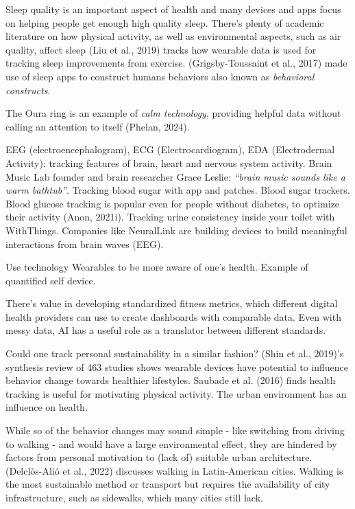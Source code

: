 \documentclass[
  letterpaper,
  DIV=11,
  numbers=noendperiod]{scrartcl}
\begin{document}
Sleep quality is an important aspect of health and many devices and apps
focus on helping people get enough high quality sleep. There's plenty of
academic literature on how physical activity, as well as environmental
aspects, such as air quality, affect sleep (Liu et al., 2019) tracks how
wearable data is used for tracking sleep improvements from exercise.
(Grigsby-Toussaint et al., 2017) made use of sleep apps to construct
humans behaviors also known as \emph{behavioral constructs}.

The Oura ring is an example of \emph{calm technology}, providing helpful
data without calling an attention to itself (Phelan, 2024).

EEG (electroencephalogram), ECG (Electrocardiogram), EDA (Electrodermal
Activity): tracking features of brain, heart and nervous system
activity. Brain Music Lab founder and brain researcher Grace Leslie:
\emph{``brain music sounds like a warm bathtub''}. Tracking blood sugar
with app and patches. Blood sugar trackers. Blood glucose tracking is
popular even for people without diabetes, to optimize their activity
(Anon, 2021i). Tracking urine consistency inside your toilet with
WithThings. Companies like NeuralLink are building devices to build
meaningful interactions from brain waves (EEG).

Use technology Wearables to be more aware of one's health. Example of
quantified self device.

There's value in developing standardized fitness metrics, which
different digital health providers can use to create dashboards with
comparable data. Even with messy data, AI has a useful role as a
translator between different standards.

Could one track personal sustainability in a similar fashion? (Shin et
al., 2019)'s synthesis review of 463 studies shows wearable devices have
potential to influence behavior change towards healthier lifestyles.
Saubade et al. (2016) finds health tracking is useful for motivating
physical activity. The urban environment has an influence on health.

While so of the behavior changes may sound simple - like switching from
driving to walking - and would have a large environmental effect, they
are hindered by factors from personal motivation to (lack of) suitable
urban architecture. (Delclòs-Alió et al., 2022) discusses walking in
Latin-American cities. Walking is the most sustainable method or
transport but requires the availability of city infrastructure, such as
sidewalks, which many cities still lack.
\end{document}
